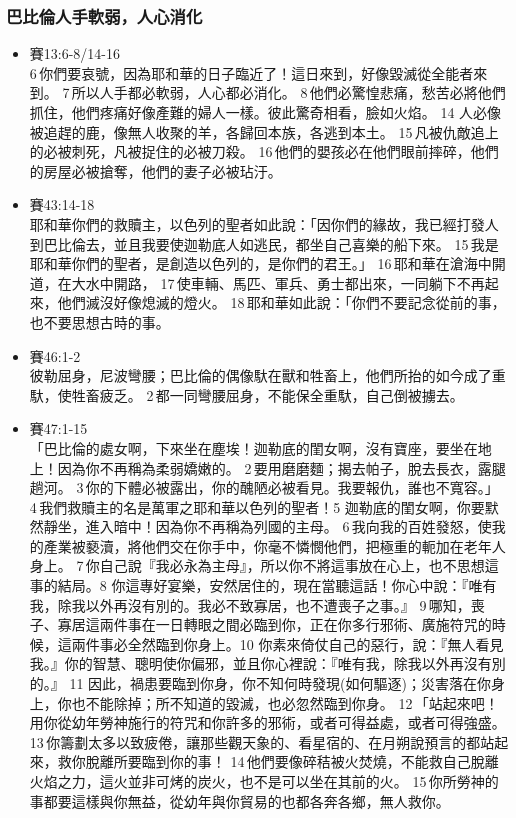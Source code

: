 \subsubsection{巴比倫人手軟弱，人心消化}
\begin{itemize}
\item 賽13:6-8/14-16\\
6 你們要哀號，因為耶和華的日子臨近了！這日來到，好像毀滅從全能者來到。 7 所以人手都必軟弱，人心都必消化。 8 他們必驚惶悲痛，愁苦必將他們抓住，他們疼痛好像產難的婦人一樣。彼此驚奇相看，臉如火焰。 
14 人必像被追趕的鹿，像無人收聚的羊，各歸回本族，各逃到本土。 15 凡被仇敵追上的必被刺死，凡被捉住的必被刀殺。 16 他們的嬰孩必在他們眼前摔碎，他們的房屋必被搶奪，他們的妻子必被玷汙。
\item 賽43:14-18\\
耶和華你們的救贖主，以色列的聖者如此說：「因你們的緣故，我已經打發人到巴比倫去，並且我要使迦勒底人如逃民，都坐自己喜樂的船下來。 15 我是耶和華你們的聖者，是創造以色列的，是你們的君王。」 16 耶和華在滄海中開道，在大水中開路， 17 使車輛、馬匹、軍兵、勇士都出來，一同躺下不再起來，他們滅沒好像熄滅的燈火。 18 耶和華如此說：「你們不要記念從前的事，也不要思想古時的事。
\item 賽46:1-2\\
彼勒屈身，尼波彎腰；巴比倫的偶像馱在獸和牲畜上，他們所抬的如今成了重馱，使牲畜疲乏。 2 都一同彎腰屈身，不能保全重馱，自己倒被擄去。
\item 賽47:1-15\\
「巴比倫的處女啊，下來坐在塵埃！迦勒底的閨女啊，沒有寶座，要坐在地上！因為你不再稱為柔弱嬌嫩的。 2 要用磨磨麵；揭去帕子，脫去長衣，露腿趟河。 3 你的下體必被露出，你的醜陋必被看見。我要報仇，誰也不寬容。」 4 我們救贖主的名是萬軍之耶和華以色列的聖者！5 迦勒底的閨女啊，你要默然靜坐，進入暗中！因為你不再稱為列國的主母。 6 我向我的百姓發怒，使我的產業被褻瀆，將他們交在你手中，你毫不憐憫他們，把極重的軛加在老年人身上。 7 你自己說『我必永為主母』，所以你不將這事放在心上，也不思想這事的結局。8 你這專好宴樂，安然居住的，現在當聽這話！你心中說：『唯有我，除我以外再沒有別的。我必不致寡居，也不遭喪子之事。』 9 哪知，喪子、寡居這兩件事在一日轉眼之間必臨到你，正在你多行邪術、廣施符咒的時候，這兩件事必全然臨到你身上。10 你素來倚仗自己的惡行，說：『無人看見我。』你的智慧、聰明使你偏邪，並且你心裡說：『唯有我，除我以外再沒有別的。』 11 因此，禍患要臨到你身，你不知何時發現(如何驅逐)；災害落在你身上，你也不能除掉；所不知道的毀滅，也必忽然臨到你身。
12 「站起來吧！用你從幼年勞神施行的符咒和你許多的邪術，或者可得益處，或者可得強盛。 13 你籌劃太多以致疲倦，讓那些觀天象的、看星宿的、在月朔說預言的都站起來，救你脫離所要臨到你的事！ 14 他們要像碎秸被火焚燒，不能救自己脫離火焰之力，這火並非可烤的炭火，也不是可以坐在其前的火。 15 你所勞神的事都要這樣與你無益，從幼年與你貿易的也都各奔各鄉，無人救你。

\end{itemize}
